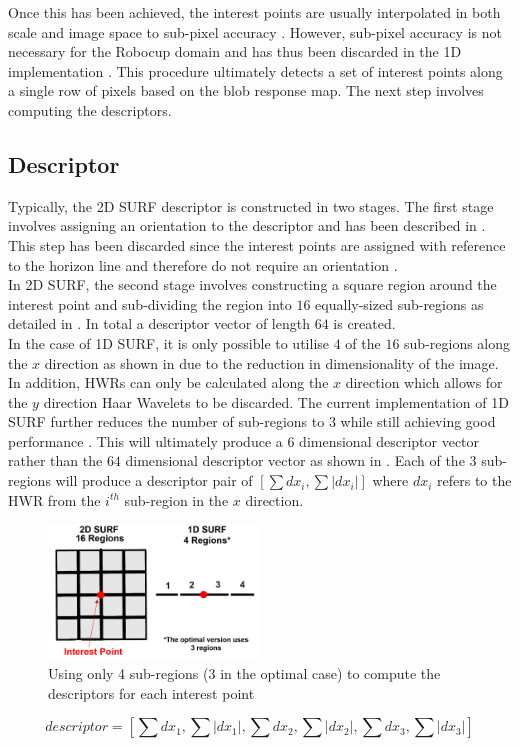 Once this has been achieved, the interest points are usually interpolated in both scale and image space to sub-pixel accuracy \citep{Evans2009}. However, sub-pixel accuracy is not necessary for the Robocup domain and has thus been discarded in the 1D implementation \citep{Anderson}. This procedure ultimately detects a set of interest points along a single row of pixels based on the blob response map. The next step involves computing the descriptors.\\  

\subsection{Descriptor}
\label{sec:1dsurfDescribe}
Typically, the 2D SURF descriptor is constructed in two stages. The first stage involves assigning an orientation to the descriptor and has been described in . This step has been discarded since the interest points are assigned with reference to the horizon line and therefore do not require an orientation \cite{Anderson}.\\

In 2D SURF, the second stage involves constructing a square region around the interest point and sub-dividing the region into $16$ equally-sized sub-regions as detailed in . In total a descriptor vector of length $64$ is created.\\

In the case of 1D SURF, it is only possible to utilise $4$ of the $16$ sub-regions along the $x$ direction as shown in  due to the reduction in dimensionality of the image. In addition, HWRs can only be calculated along the $x$ direction which allows for the $y$ direction Haar Wavelets to be discarded. The current implementation of 1D SURF further reduces the number of sub-regions to $3$ while still achieving good performance \citep{Anderson}. This will ultimately produce a $6$ dimensional descriptor vector rather than the $64$ dimensional descriptor vector as shown in . Each of the $3$ sub-regions will produce a descriptor pair of $[\sum dx_i, \sum |dx_i|]$ where $dx_i$ refers to the HWR from the $i^{th}$ sub-region in the $x$ direction. \\

\begin{figure}[h!] 
  \centering
    \includegraphics[width=0.5\textwidth]{../Drawings/methods/SURF1D_Descriptor.jpg}
    \caption{Using only 4 sub-regions (3 in the optimal case) to compute the descriptors for each interest point}
    \label{fig:subregions4}
\end{figure}


\begin{equation}
descriptor = [ \sum dx_1, \sum |dx_1|,\sum dx_2, \sum |dx_2|,\sum dx_3, \sum |dx_3|] 
\label{eqn:descriptor1d}
\end{equation}